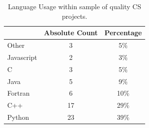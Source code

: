 \documentclass[sigconf,review,anonymous]{acmart}
\begin{document}

 



\begin{table}[!t]
\caption{Language Usage within sample of quality CS projects. 
}\label{tbl:language}
\vspace{3mm}
\begin{center}
\vspace{-10pt}\begin{tabular}{l|c|c}
 \multicolumn{1}{c|}{} & \multicolumn{1}{c|}{Absolute Count} & \multicolumn{1}{c}{Percentage}\\
\hline
Other & 3 &  5\%  \\ 
Javascript	& 2 & 3\% \\ 
C &	3 & 5\% \\ 
Java	& 5 & 9\% \\ 
Fortran	& 6 & 10\% \\
C++	& 17 & 29\% \\
Python & 23 & 39\% 
\end{tabular}
\end{center}
\vspace{3mm}
\end{table}
\end{document}

